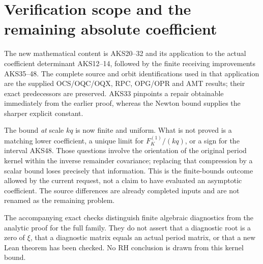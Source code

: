 \documentclass[11pt,a4paper]{article}
\begin{document}
\section{Verification scope and the remaining absolute coefficient}
\label{sec:AKS-scope}

The new mathematical content is AKS20--32 and its application to the
actual coefficient determinant AKS12--14, followed by the finite
receiving improvements AKS35--48. The complete source and orbit
identifications used in that application are the supplied OCS/OQC/OQX,
RPC, OPG/OPR and AMT results; their exact predecessors are preserved.
AKS33 pinpoints a repair obtainable immediately from the earlier proof,
whereas the Newton bound supplies the sharper explicit constant.

The bound \emph{at} scale $kq$ is now finite and uniform. What is not
proved is a matching lower coefficient, a unique limit for
$F_K^{(1)}/(kq)$, or a sign for the interval AKS48. Those questions involve
the orientation of the original period kernel within the inverse
remainder covariance; replacing that compression by a scalar bound
loses precisely that information. This is the finite-bounds outcome
allowed by the current request, not a claim to have evaluated an
asymptotic coefficient. The source differences are already completed
inputs and are not renamed as the remaining problem.

The accompanying exact checks distinguish finite algebraic diagnostics
from the analytic proof for the full family. They do not assert that a
diagnostic root is a zero of $\xi$, that a diagnostic matrix equals an
actual period matrix, or that a new Lean theorem has been checked.
No RH conclusion is drawn from this kernel bound.


\end{document}
